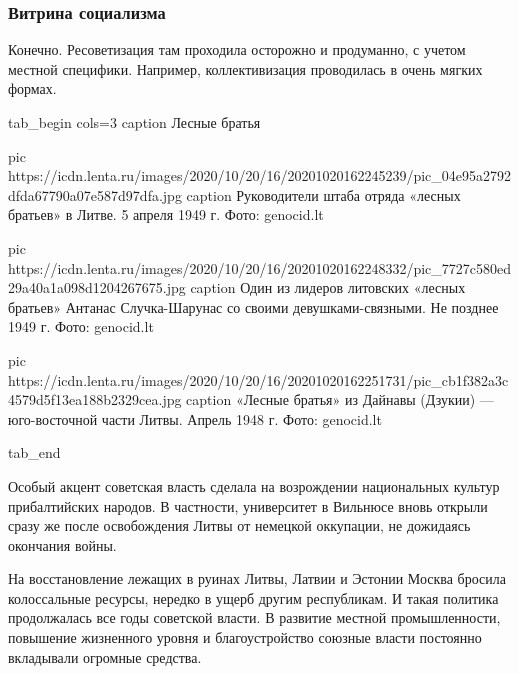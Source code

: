  
 
 
 
 
\subsubsection{Витрина социализма}
\label{sec:02_12_2020.news.ru.lenta_ru.mozzhuhin_andrei.1.pribaltika.vitrina_socializma}


Конечно. Ресоветизация там проходила осторожно и продуманно, с учетом местной
специфики. Например, коллективизация проводилась в очень мягких формах.

\ifcmt
tab_begin cols=3
	caption Лесные братья

	pic https://icdn.lenta.ru/images/2020/10/20/16/20201020162245239/pic_04e95a2792dfda67790a07e587d97dfa.jpg
	caption Руководители штаба отряда «лесных братьев» в Литве. 5 апреля 1949 г.  Фото: genocid.lt

	pic https://icdn.lenta.ru/images/2020/10/20/16/20201020162248332/pic_7727c580ed29a40a1a098d1204267675.jpg
	caption Один из лидеров литовских «лесных братьев» Антанас Случка-Шарунас со своими девушками-связными. Не позднее 1949 г. Фото: genocid.lt

	pic https://icdn.lenta.ru/images/2020/10/20/16/20201020162251731/pic_cb1f382a3c4579d5f13ea188b2329cea.jpg
	caption «Лесные братья» из Дайнавы (Дзукии) — юго-восточной части Литвы. Апрель 1948 г.  Фото: genocid.lt

tab_end
\fi

Особый акцент советская власть сделала на возрождении национальных культур
прибалтийских народов. В частности, университет в Вильнюсе вновь открыли сразу
же после освобождения Литвы от немецкой оккупации, не дожидаясь окончания
войны.

На восстановление лежащих в руинах Литвы, Латвии и Эстонии Москва бросила
колоссальные ресурсы, нередко в ущерб другим республикам. И такая политика
продолжалась все годы советской власти. В развитие местной промышленности,
повышение жизненного уровня и благоустройство союзные власти постоянно
вкладывали огромные средства.

